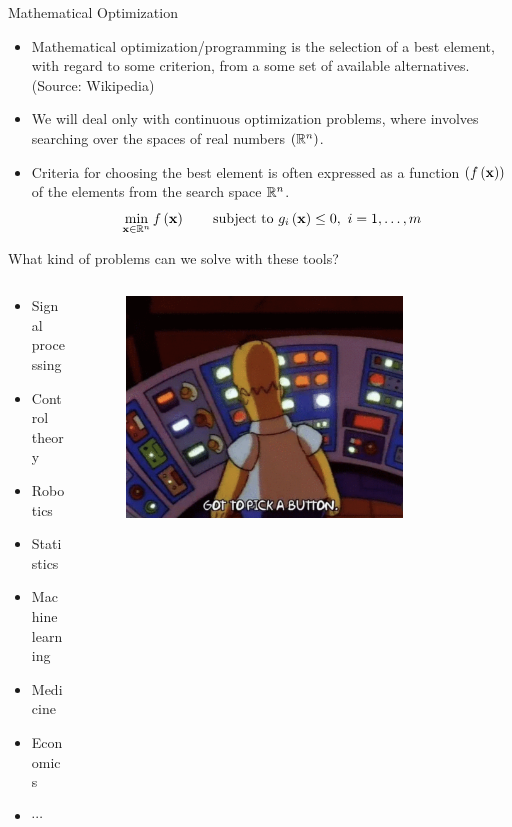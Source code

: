\documentclass[aspectratio=169]{beamer}
\let\olditem\item
\renewcommand{\item}{\setlength{\itemsep}{\fill}\olditem}
\def\mf{\ensuremath\mathbf}
\def\mb{\ensuremath\mathbb}
\def\lp{\ensuremath\left(}
\def\rp{\ensuremath\right)}
\newcommand{\ct}[1]{\lp #1\rp}
\begin{document}
\begin{frame}{Mathematical Optimization}
  \begin{itemize}
    \item Mathematical optimization/programming is the selection of a best element, with regard to some criterion, from a some set of available alternatives. (Source: Wikipedia)
    
    \item We will deal only with continuous optimization problems, where involves searching over the spaces of real numbers $\ct{\mb{R}^n}$.
    
    \item Criteria for choosing the best element is often expressed as a function $\ct{f\ct{\mf{x}}}$ of the elements from the search space $\mb{R}^n$.
    \[ \min_{\mf{x} \in \mb{R}^n} f\ct{\mf{x}} \quad \quad \mathrm{subject \,\, to} \,\, g_i\ct{\mf{x}} \leq 0, \,\, i = 1, \ldots, m \]
  \end{itemize}
\end{frame}
  

\begin{frame}{What kind of problems can we solve with these tools?}
  \begin{columns}
    \begin{column}{0.3\textwidth}
      \begin{itemize}
        \item Signal processing
        \item Control theory
        \item Robotics
        \item Statistics
        \item Machine learning
        \item Medicine
        \item Economics
        \item $\cdots$
      \end{itemize}
    \end{column}
    \begin{column}{0.675\textwidth}
      \begin{figure}
        \centering
        \includegraphics[width=0.8\textwidth]{toomany.png}
      \end{figure}
    \end{column}    
  \end{columns}
\end{frame}
\end{document}
